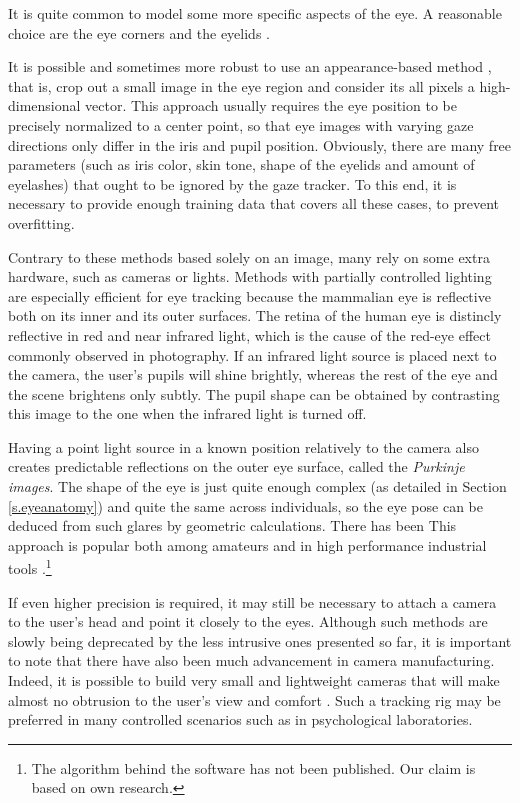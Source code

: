It is quite common to model some more specific aspects of the eye.
A reasonable choice are the eye corners \cite{zhu12} and the eyelids \cite{yuille92}.

It is possible and sometimes more robust to use an appearance-based method \cite{tan02}, that is, crop out a small image in the eye region and consider its all pixels a high-dimensional vector.
This approach usually requires the eye position to be precisely normalized to a center point, so that eye images with varying gaze directions only differ in the iris and pupil position.
Obviously, there are many free parameters (such as iris color, skin tone, shape of the eyelids and amount of eyelashes) that ought to be ignored by the gaze tracker.
To this end, it is necessary to provide enough training data that covers all these cases, to prevent overfitting.

Contrary to these methods based solely on an image, many rely on some extra hardware, such as cameras or lights.
Methods with partially controlled lighting are especially efficient for eye tracking because the mammalian eye is reflective both on its inner and its outer surfaces.
The retina of the human eye is distincly reflective in red and near infrared light, which is the cause of the red-eye effect commonly observed in photography.
If an infrared light source is placed next to the camera, the user's pupils will shine brightly, whereas the rest of the eye and the scene brightens only subtly.
The pupil shape can be obtained by contrasting this image to the one when the infrared light is turned off.

Having a point light source in a known position relatively to the camera also creates predictable reflections on the outer eye surface, called the \textit{Purkinje images}.
The shape of the eye is just quite enough complex (as detailed in Section \ref{s.eyeanatomy}) and quite the same across individuals, so the eye pose can be deduced from such glares by geometric calculations.
There has been \todo{\dots}\cite{villanueva08}
This approach is popular both among amateurs \cite{yucel09,wolski16} and in high performance industrial tools \cite{p:tobii}.\footnote{
The algorithm behind the software \cite{p:tobii} has not been published.
Our claim is based on own research.
}

If even higher precision is required, it may still be necessary to attach a camera to the user's head and point it closely to the eyes.
Although such methods are slowly being deprecated by the less intrusive ones presented so far, it is important to note that there have also been much advancement in camera manufacturing.
Indeed, it is possible to build very small and lightweight cameras that will make almost no obtrusion to the user's view and comfort \cite{p:pupil}.
Such a tracking rig may be preferred in many controlled scenarios such as in psychological laboratories.

